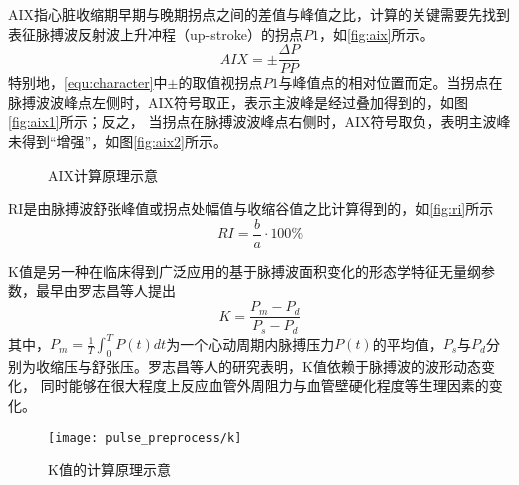 AIX指心脏收缩期早期与晚期拐点之间的差值与峰值之比，计算的关键需要先找到表征脉搏波反射波上升冲程（up-stroke）的拐点$P1$，如\autoref{fig:aix}所示\cite{Su2014}。
\begin{equation}
    \label{equ:aix}
    AIX = \pm \frac{\Delta P}{PP}
\end{equation}
特别地，\autoref{equ:character}中$\pm$的取值视拐点$P1$与峰值点的相对位置而定。当拐点在脉搏波波峰点左侧时，AIX符号取正，表示主波峰是经过叠加得到的，如图\autoref{fig:aix1}所示；反之，
当拐点在脉搏波波峰点右侧时，AIX符号取负，表明主波峰未得到“增强”，如图\autoref{fig:aix2}所示。
\begin{figure}[htbp]
    \centering
    \quad
    \caption[AIX计算原理示意]{\label{fig:aix}AIX计算原理示意\cite{Su2014}}
\end{figure}

RI是由脉搏波舒张峰值或拐点处幅值与收缩谷值之比计算得到的，如\autoref{fig:ri}所示\cite{Su2014,Elgendi2012}
\begin{equation}
    \label{equ:ri}
    RI = \frac{b}{a} \cdot 100\%
\end{equation}

K值是另一种在临床得到广泛应用的基于脉搏波面积变化的形态学特征无量纲参数，最早由罗志昌等人提出\cite{Luo1988,PPGYY}
\begin{equation}
    \label{equ:ppgk}
    K=\frac{P_m-P_d}{P_s-P_d}
\end{equation}
其中，$P_m=\frac{1}{T}\int_{0}^{T}P(t)dt$为一个心动周期内脉搏压力$P(t)$的平均值，$P_s$与$P_d$分别为收缩压与舒张压。罗志昌等人的研究表明，K值依赖于脉搏波的波形动态变化，
同时能够在很大程度上反应血管外周阻力与血管壁硬化程度等生理因素的变化。
\begin{figure}[htbp]
    \centering
    \texttt{[image: pulse\_preprocess/k]}
    \caption{\label{fig:k}K值的计算原理示意}
\end{figure}

